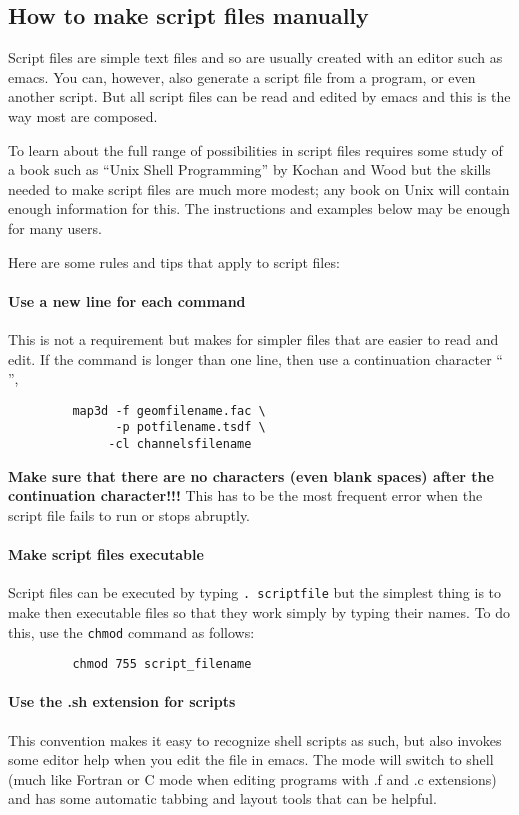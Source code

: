 \subsection{How to make script files manually}

Script files are simple text files and so are usually created with an
editor such as emacs.  You can, however, also generate a script file from a
program, or even another script.  But all script files can be read and
edited by emacs and this is the way most are composed.

To learn about the full range of possibilities in script files requires some
study of a book such as ``Unix Shell Programming'' by Kochan and Wood but
the skills needed to make \map{} script files are much more modest; any
book on Unix will contain enough information for this.  The instructions
and examples below may be enough for many users.

Here are some rules and tips that apply to script files:

\paragraph{Use a new line for each command }  This is not a requirement but
makes for simpler files that are easier to read and edit.  If the command
is longer than one line, then use a continuation character ``\\'', 
\begin{verbatim}
         map3d -f geomfilename.fac \
               -p potfilename.tsdf \
              -cl channelsfilename
\end{verbatim}

{\bf Make sure that there are no characters (even blank spaces) after the
continuation character!!!}  This has to be the most frequent error when the
script file fails to run or stops abruptly.

\paragraph{Make script files executable }  Script files can be executed by
typing {\tt . scriptfile} but the simplest thing is to make then executable
files so that they work simply by typing their names. To do this, use the
{\tt chmod} command as follows:
\begin{verbatim}
         chmod 755 script_filename
\end{verbatim}

\paragraph{Use the .sh extension for scripts }  This convention makes it
easy to recognize shell scripts as such, but also invokes some editor help
when you edit the file in emacs.  The mode will switch to shell (much like
Fortran or C mode when editing programs with .f and .c extensions) and has
some automatic tabbing and layout tools that can be helpful.

